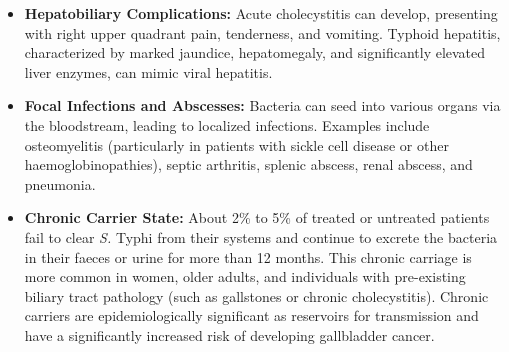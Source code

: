 \begin{itemize}
\item \textbf{Hepatobiliary Complications:} Acute cholecystitis can develop, presenting with right upper quadrant pain, tenderness, and vomiting. Typhoid hepatitis, characterized by marked jaundice, hepatomegaly, and significantly elevated liver enzymes, can mimic viral hepatitis.
\item \textbf{Focal Infections and Abscesses:} Bacteria can seed into various organs via the bloodstream, leading to localized infections. Examples include osteomyelitis (particularly in patients with sickle cell disease or other haemoglobinopathies), septic arthritis, splenic abscess, renal abscess, and pneumonia.
\item \textbf{Chronic Carrier State:} About 2\% to 5\% of treated or untreated patients fail to clear \textit{S.} Typhi from their systems and continue to excrete the bacteria in their faeces or urine for more than 12 months. This chronic carriage is more common in women, older adults, and individuals with pre-existing biliary tract pathology (such as gallstones or chronic cholecystitis). Chronic carriers are epidemiologically significant as reservoirs for transmission and have a significantly increased risk of developing gallbladder cancer.
\end{itemize}

